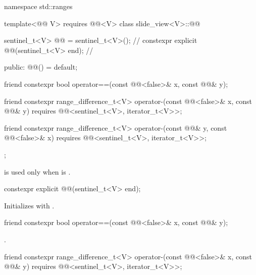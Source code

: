 \begin{codeblock}
namespace std::ranges {
  template<@@ V>
    requires @@<V>
  class slide_view<V>::@@ {
    sentinel_t<V> @@ = sentinel_t<V>();             // \expos
    constexpr explicit @@(sentinel_t<V> end);   // \expos

  public:
    @@() = default;

    friend constexpr bool operator==(const @@<false>& x, const @@& y);

    friend constexpr range_difference_t<V>
      operator-(const @@<false>& x, const @@& y)
        requires @@<sentinel_t<V>, iterator_t<V>>;

    friend constexpr range_difference_t<V>
      operator-(const @@& y, const @@<false>& x)
        requires @@<sentinel_t<V>, iterator_t<V>>;
  };
}
\end{codeblock}

\pnum
\begin{note}
 is used
only when  is .
\end{note}

\begin{itemdecl}
constexpr explicit @@(sentinel_t<V> end);
\end{itemdecl}

\begin{itemdescr}
\pnum
\effects
Initializes  with .
\end{itemdescr}

\begin{itemdecl}
friend constexpr bool operator==(const @@<false>& x, const @@& y);
\end{itemdecl}

\begin{itemdescr}
\pnum
\returns
{}.
\end{itemdescr}

\begin{itemdecl}
friend constexpr range_difference_t<V>
  operator-(const @@<false>& x, const @@& y)
    requires @@<sentinel_t<V>, iterator_t<V>>;
\end{itemdecl}


